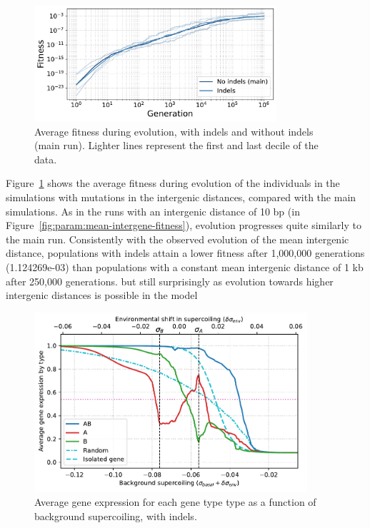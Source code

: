 \begin{figure}[H]
\centering
\includegraphics[width=0.8\textwidth]{param/evolve-intergene/fitness_all_with_main.pdf}
\caption[Average fitness during evolution, with indels]{Average fitness during evolution, with indels and without indels (main run).
Lighter lines represent the first and last decile of the data.}
\label{fig:param:evolve-intergene-fitness}
\end{figure}

Figure~\ref{fig:param:evolve-intergene-fitness} shows the average fitness during evolution of the individuals in the simulations with mutations in the intergenic distances, compared with the main simulations.
As in the runs with an intergenic distance of 10 bp (in Figure~\ref{fig:param:mean-intergene-fitness}), evolution progresses quite similarly to the main run.
Consistently with the observed evolution of the mean intergenic distance, populations with indels attain a lower fitness after 1,000,000 generations (1.124269e-03) than populations with a constant mean intergenic distance of 1 kb after 250,000 generations.
but still surprisingly as evolution towards higher intergenic distances is possible in the model

\begin{figure}[H]
\centering
\includegraphics[width=0.9\textwidth]{param/evolve-intergene/activity_sigmas_avg.pdf}
\caption[Average gene expression as a function of background supercoiling, with indels]{Average gene expression for each gene type type as a function of background supercoiling, with indels.}
\label{fig:param:evolve-intergene-activ-by-sigma}
\end{figure}

